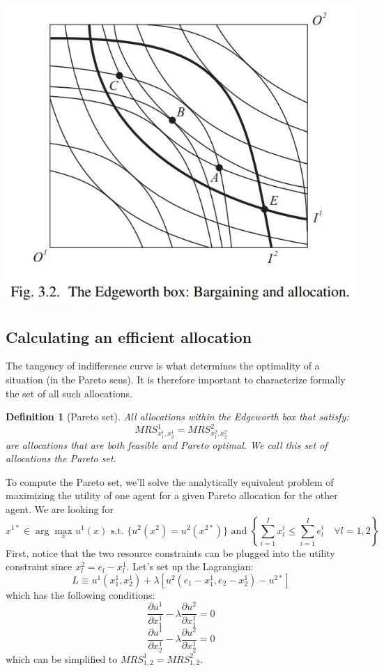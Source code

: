 \documentclass[12pt]{report}
\newtheorem{definition}{Definition}[chapter]
\begin{document}
\begin{center}
\includegraphics[scale=0.55]{images/edge03}
\end{center}

\subsection{Calculating an efficient allocation}

The tangency of indifference curve is what determines the optimality of a situation (in the Pareto sens). It is therefore important to characterize formally the set of all such allocations.

\begin{definition}[Pareto set]
All allocations within the Edgeworth box that satisfy: $$MRS_{x_1^1,x_2^1}^1 = MRS_{x_1^2,x_2^2}^2 $$ are allocations that are both feasible and Pareto optimal. We call this set of allocations the Pareto set.
\end{definition}

To compute the Pareto set, we'll solve the analytically equivalent problem of maximizing the utility of one agent for a given Pareto allocation for the other agent. We are looking for $$ x^{1*} \in \operatorname{arg}\max_x u^1(x) \text{ s.t. } \{u^2(x^2) = u^2(x^{2*})\} \text{ and } \left\lbrace\sum_{i=1}^{I} x_l^i \leq \sum_{i=1}^{I} e_l^i \quad \forall l =1,2\right\rbrace $$ First, notice that the two resource constraints can be plugged into the utility constraint since $x_l^2 = e_l - x_l^1$. Let's set up the Lagrangian: $$L\equiv u^1(x_1^1, x_2^1) + \lambda\left[u^2(e_1 - x_1^1, e_2 - x_2^1) - u^{2*}\right] $$ which has the following conditions: $$ \frac{\partial u^{1}}{\partial x_1^1} -\lambda \frac{\partial u^{2}}{\partial x_1^1} = 0 $$ $$\frac{\partial u^{1}}{\partial x_2^1} -\lambda \frac{\partial u^{2}}{\partial x_2^1} = 0 $$ which can be simplified to $MRS_{1,2}^1 = MRS_{1,2}^2$.
\end{document}
